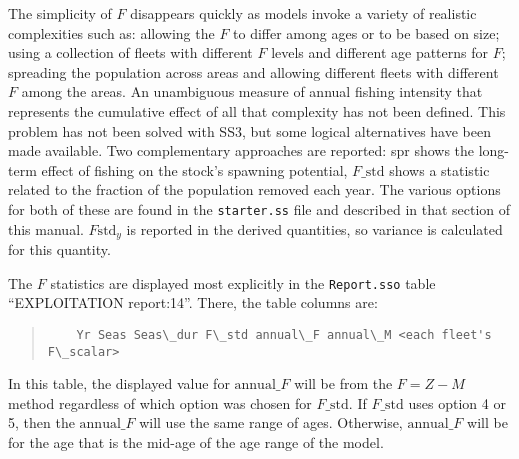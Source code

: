 The simplicity of $F$ disappears quickly as models invoke a variety of realistic complexities such as: allowing the $F$ to differ among ages or to be based on size; using a collection of fleets with different $F$ levels and different age patterns for $F$; spreading the population across areas and allowing different fleets with different $F$ among the areas. An unambiguous measure of annual fishing intensity that represents the cumulative effect of all that complexity has not been defined. This problem has not been solved with SS3, but some logical alternatives have been made available. Two complementary approaches are reported: \gls{spr} shows the long-term effect of fishing on the stock’s spawning potential, $F\text{\_std}$ shows a statistic related to the fraction of the population removed each year. The various options for both of these are found in the \texttt{starter.ss} file and described in that section of this manual. $F\text{std}_y$ is reported in the derived quantities, so variance is calculated for this quantity.


The $F$ statistics are displayed most explicitly in the \texttt{Report.sso} table ``EXPLOITATION report:14''. There, the table columns are:
\begin{quote}
	\begin{verbatim}
	Yr Seas Seas\_dur F\_std annual\_F annual\_M <each fleet's F\_scalar>
	\end{verbatim}
\end{quote}

In this table, the displayed value for $\text{annual\_}F$ will be from the $F=Z-M$ method regardless of which option was chosen for $F\text{\_std}$. If $F\text{\_std}$ uses option 4 or 5, then the $\text{annual\_}F$ will use the same range of ages. Otherwise, $\text{annual\_}F$ will be for the age that is the mid-age of the age range of the model.



